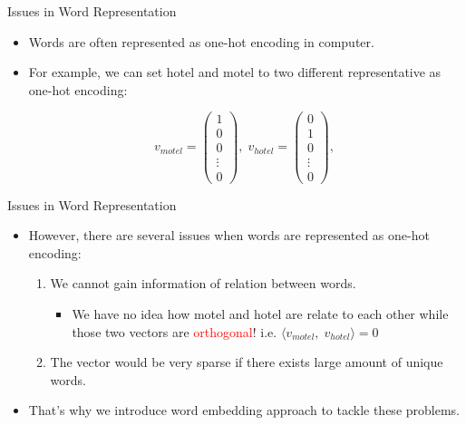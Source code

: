 \begin{frame}[fragile]{Issues in Word Representation}

  \begin{itemize}
    \item Words are often represented as one-hot encoding in computer.
    \item For example, we can set hotel and motel to two different
          representative as one-hot encoding:
          \begin{center}
            $$
              {v_{motel}}=\begin{pmatrix} 1 \\ 0 \\ 0 \\ \vdots \\ 0 \end{pmatrix},\;
              {v_{hotel}}=\begin{pmatrix} 0 \\ 1 \\ 0 \\ \vdots \\ 0 \end{pmatrix},\;
            $$
          \end{center}
  \end{itemize}

\end{frame}

\begin{frame}[fragile]{Issues in Word Representation}

  \begin{itemize}
    \item However, there are several issues when words are represented as one-hot encoding:
          \begin{enumerate}
            \item We cannot gain information of relation between words.
                  \begin{itemize}
                    \item We have no idea how motel and hotel are relate to each other while those two vectors are \textcolor{red}{orthogonal}! i.e. $ \langle v_{motel} , \; v_{hotel} \rangle = 0$
                  \end{itemize}
            \item The vector would be very sparse if there exists large amount of unique words.
          \end{enumerate}
    \item That's why we introduce word embedding approach to tackle these problems. \cite{word2vec}
  \end{itemize}

\end{frame}

